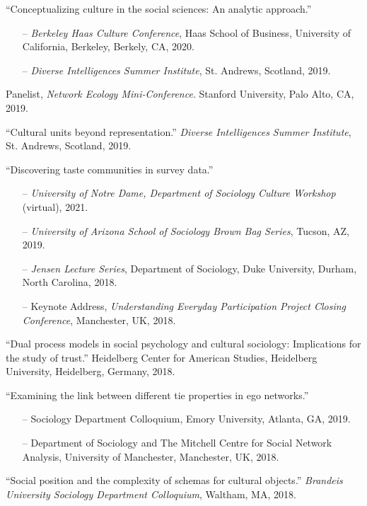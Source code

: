\ind ``Conceptualizing culture in the social sciences: An analytic approach.''
\begin{itemize}[leftmargin=0.8in, topsep = 0pt]
	\setlength\itemsep{-0.55em}
	\item[--] {\em Berkeley Haas Culture Conference}, Haas School of Business, University of California, Berkeley, Berkely, CA, 2020.
	\item[--] {\em Diverse Intelligences Summer Institute}, St. Andrews, Scotland, 2019.
\end{itemize}

\ind Panelist, \emph{Network Ecology Mini-Conference}. Stanford University, Palo Alto, CA, 2019.

\ind ``Cultural units beyond representation.'' {\em Diverse Intelligences Summer Institute}, St. Andrews, Scotland, 2019.

\ind ``Discovering taste communities in survey data.''

\begin{itemize}[leftmargin=0.8in, topsep = 0pt]
	\setlength\itemsep{-0.55em}
	\item[--] {\em University of Notre Dame, Department of Sociology Culture Workshop} (virtual), 2021.
	\item[--] {\em University of Arizona School of Sociology Brown Bag Series},  Tucson, AZ, 2019. 
    \item[--]{\em Jensen Lecture Series}, Department of Sociology, Duke University, Durham, North Carolina, 2018.
    \item[--]Keynote Address, {\em Understanding Everyday Participation Project Closing Conference}, Manchester, UK, 2018.
\end{itemize}

\ind ``Dual process models in social psychology and cultural sociology: Implications for the study of trust.'' Heidelberg Center for American Studies, Heidelberg University, Heidelberg, Germany, 2018. 

\ind ``Examining the link between different tie properties in ego networks.'' 
    \begin{itemize}[leftmargin=0.8in, topsep = 0pt]
    \setlength\itemsep{-0.55em}
    \item[--] Sociology Department Colloquium, Emory University, Atlanta, GA, 2019.
	\item[--] Department of Sociology and The Mitchell Centre for Social Network Analysis, University of Manchester, Manchester, UK, 2018.
\end{itemize}

\ind ``Social position and the complexity of schemas for cultural objects.'' {\em Brandeis University Sociology Department Colloquium}, Waltham, MA, 2018.



